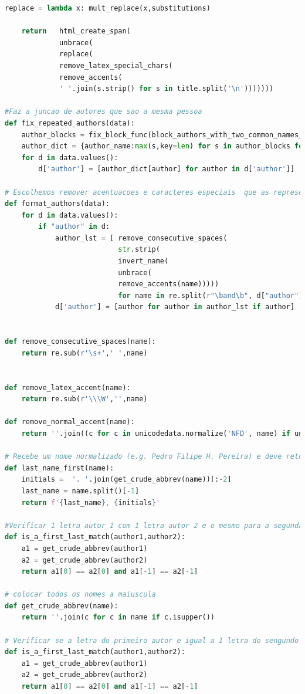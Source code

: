 \documentclass[11pt,a4paper]{report}
\begin{document}
\begin{lstlisting}[language=python]
    replace = lambda x: mult_replace(x,substitutions)

    return   html_create_span(
             unbrace(
             replace(
             remove_latex_special_chars(
             remove_accents(
             ' '.join(s.strip() for s in title.split('\n')))))))

#Faz a juncao de autores que sao a mesma pessoa
def fix_repeated_authors(data):
    author_blocks = fix_block_func(block_authors_with_two_common_names_v2(get_author_list(data)))
    author_dict = {author_name:max(s,key=len) for s in author_blocks for author_name in s}
    for d in data.values():
        d['author'] = [author_dict[author] for author in d['author']]

# Escolhemos remover acentuacoes e caracteres especiais  que as representam em latex (e.g. "\\~") do nome dos autores.
def format_authors(data):
    for d in data.values():
        if "author" in d:
            author_lst = [ remove_consecutive_spaces(
                           str.strip(
                           invert_name(
                           unbrace(
                           remove_accents(name)))))
                           for name in re.split(r"\band\b", d["author"].replace("\n", " "))]
            d['author'] = [author for author in author_lst if author]


def remove_consecutive_spaces(name):
    return re.sub(r'\s+',' ',name)


def remove_latex_accent(name):
    return re.sub(r'\\\W','',name)

def remove_normal_accent(name):
    return ''.join((c for c in unicodedata.normalize('NFD', name) if unicodedata.category(c) != 'Mn'))

# Recebe um nome normalizado (e.g. Pedro Filipe H. Pereira) e deve retornar "invertido" (e.g. Pereira, P. F. H.)
def last_name_first(name):
    initials =  '. '.join(get_crude_abbrev(name))[:-2]
    last_name = name.split()[-1]
    return f'{last_name}, {initials}'

#Verificar 1 letra autor 1 com 1 letra autor 2 e o mesmo para a segunda
def is_a_first_last_match(author1,author2):
    a1 = get_crude_abbrev(author1)
    a2 = get_crude_abbrev(author2)
    return a1[0] == a2[0] and a1[-1] == a2[-1]

# colocar todos os nomes a maiuscula
def get_crude_abbrev(name):
    return ''.join(c for c in name if c.isupper())

# Verificar se a letra do primeiro autor e igual a 1 letra do sengundo autor e o mesmo para a 2 letra 
def is_a_first_last_match(author1,author2):
    a1 = get_crude_abbrev(author1)
    a2 = get_crude_abbrev(author2)
    return a1[0] == a2[0] and a1[-1] == a2[-1]


\end{lstlisting}
\end{document}
